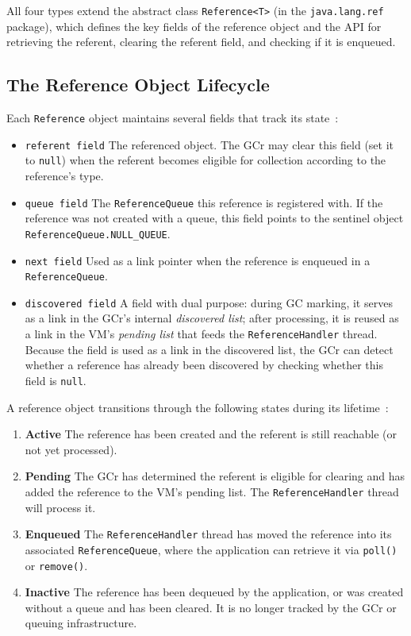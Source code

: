 All four types extend the abstract class \texttt{Reference<T>} (in the \texttt{java.lang.ref} package), which defines the key fields of the reference object and the \ac{API} for retrieving the referent, clearing the referent field, and checking if it is enqueued.

\subsection{The Reference Object Lifecycle}
\label{subsec:bg-reftypes-lifecycle}

Each \texttt{Reference} object maintains several fields that track its state~\cite{openjdk-reference-java}:

\begin{itemize}
    \item \texttt{referent field}   The referenced object. The \ac{GCr} may clear this field (set it to \texttt{null}) when the referent becomes eligible for collection according to the reference's type.
    \item \texttt{queue field}   The \texttt{ReferenceQueue} this reference is registered with. If the reference was not created with a queue, this field points to the sentinel object \texttt{ReferenceQueue.NULL\_QUEUE}.
    \item \texttt{next field}   Used as a link pointer when the reference is enqueued in a \texttt{ReferenceQueue}.
    \item \texttt{discovered field}   A field with dual purpose: during \ac{GC} marking, it serves as a link in the \ac{GCr}'s internal \emph{discovered list}; after processing, it is reused as a link in the VM's \emph{pending list} that feeds the \texttt{ReferenceHandler} thread. Because the field is used as a link in the discovered list, the \ac{GCr} can detect whether a reference has already been discovered by checking whether this field is \texttt{null}.
\end{itemize}

A reference object transitions through the following states during its lifetime~\cite{oracle-ref-javadoc,openjdk-reference-java}:

\begin{enumerate}
    \item \textbf{Active}   The reference has been created and the referent is still reachable (or not yet processed).
    \item \textbf{Pending}   The \ac{GCr} has determined the referent is eligible for clearing and has added the reference to the VM's pending list. The \texttt{ReferenceHandler} thread will process it.
    \item \textbf{Enqueued}   The \texttt{ReferenceHandler} thread has moved the reference into its associated \texttt{ReferenceQueue}, where the application can retrieve it via \texttt{poll()} or \texttt{remove()}.
    \item \textbf{Inactive}   The reference has been dequeued by the application, or was created without a queue and has been cleared. It is no longer tracked by the \ac{GCr} or queuing infrastructure.
\end{enumerate}

